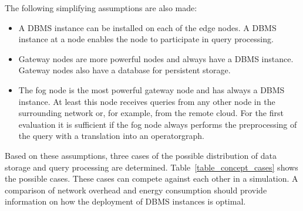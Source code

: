 \documentclass[english,version-2019-11]{uzl-thesis}
\begin{document}
The following simplifying assumptions are also made:
\begin{itemize}
 \item A DBMS instance can be installed on each of the edge nodes. A DBMS instance at a node enables the node to participate in query processing.
 \item Gateway nodes are more powerful nodes and always have a DBMS instance. Gateway nodes also have a database for persistent storage.
 \item The fog node is the most powerful gateway node and has always a DBMS instance. At least this node receives queries from any other node in the surrounding network or, for example, from the remote cloud. For the first evaluation it is sufficient if the fog node always performs the preprocessing of the query with a translation into an operatorgraph.
\end{itemize}
Based on these assumptions, three cases of the possible distribution of data storage and query processing are determined. Table~\ref{table_concept_cases} shows the possible cases. These cases can compete against each other in a simulation. A comparison of network overhead and energy consumption should provide information on how the deployment of DBMS instances is optimal.
\end{document}
